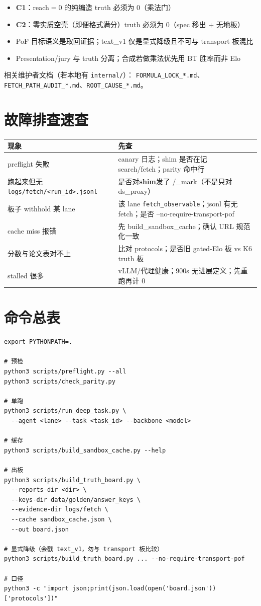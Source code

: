\documentclass[10.5pt,a4paper]{article}
\begin{document}
\begin{itemize}
  \item \textbf{C1}：reach$=0$ 的纯编造 truth 必须为 0（乘法门）
  \item \textbf{C2}：零实质空壳（即便格式满分）truth 必须为 0（spec 移出 + 无地板）
  \item PoF 目标语义是取回证据；text\_v1 仅是显式降级且不可与 transport 板混比
  \item Presentation/jury 与 truth 分离；合成若做乘法优先用 BT 胜率而非 Elo
\end{itemize}

相关维护者文档（若本地有 \texttt{internal/}）：
\texttt{FORMULA\_LOCK\_*.md}、\texttt{FETCH\_PATH\_AUDIT\_*.md}、\texttt{ROOT\_CAUSE\_*.md}。

\section{故障排查速查}

\begin{center}
\begin{tabularx}{\textwidth}{@{}lX@{}}
\toprule
现象 & 先查 \\
\midrule
preflight 失败 & canary 日志；shim 是否在记 search/fetch；parity 命中行 \\
跑起来但无 \texttt{logs/fetch/<run\_id>.jsonl} & 是否对\textbf{shim}发了 /\_mark（不是只对 ds\_proxy） \\
板子 withhold 某 lane & 该 lane \texttt{fetch\_observable}；jsonl 有无 fetch；是否 --no-require-transport-pof \\
cache miss 报错 & 先 build\_sandbox\_cache；确认 URL 规范化一致 \\
分数与论文表对不上 & 比对 protocols；是否旧 gated-Elo 板 vs K6 truth 板 \\
stalled 很多 & vLLM/代理健康；900s 无进展定义；先重跑再计 0 \\
\bottomrule
\end{tabularx}
\end{center}

\section{命令总表}

\begin{lstlisting}
export PYTHONPATH=.

# 预检
python3 scripts/preflight.py --all
python3 scripts/check_parity.py

# 单跑
python3 scripts/run_deep_task.py \
  --agent <lane> --task <task_id> --backbone <model>

# 缓存
python3 scripts/build_sandbox_cache.py --help

# 出板
python3 scripts/build_truth_board.py \
  --reports-dir <dir> \
  --keys-dir data/golden/answer_keys \
  --evidence-dir logs/fetch \
  --cache sandbox_cache.json \
  --out board.json

# 显式降级（会戳 text_v1，勿与 transport 板比较）
python3 scripts/build_truth_board.py ... --no-require-transport-pof

# 口径
python3 -c "import json;print(json.load(open('board.json'))['protocols'])"
\end{lstlisting}
\end{document}
